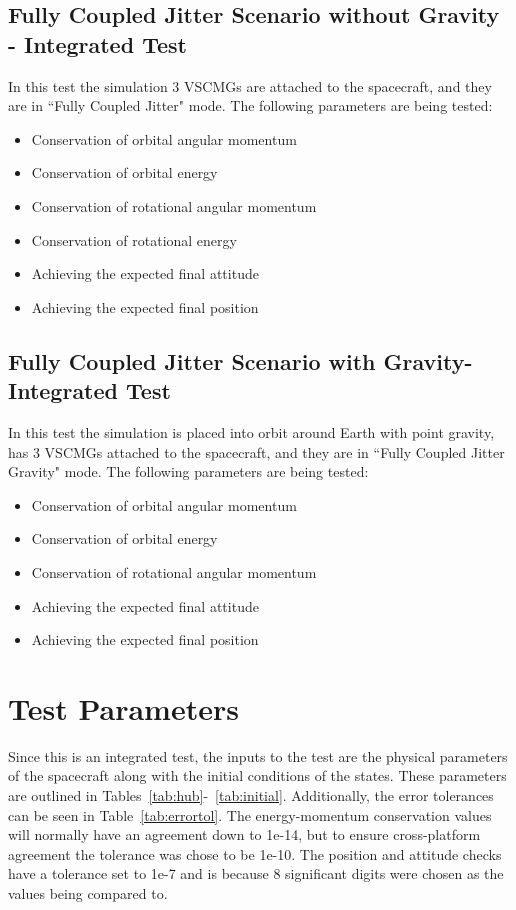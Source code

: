 \subsection{Fully Coupled Jitter Scenario without Gravity - Integrated Test}
In this test the simulation 3 VSCMGs are attached to the spacecraft, and they are in ``Fully Coupled Jitter" mode.  The following parameters are being tested:
\begin{itemize}
\item Conservation of orbital angular momentum
\item Conservation of orbital energy
\item Conservation of rotational angular momentum
\item Conservation of rotational energy
\item Achieving the expected final attitude
\item Achieving the expected final position
\end{itemize}

\subsection{Fully Coupled Jitter Scenario  with Gravity- Integrated Test}
In this test the simulation is placed into orbit around Earth with point gravity, has 3 VSCMGs attached to the spacecraft, and they are in ``Fully Coupled Jitter Gravity" mode. The following parameters are being tested:
\begin{itemize}
\item Conservation of orbital angular momentum
\item Conservation of orbital energy
\item Conservation of rotational angular momentum
\item Achieving the expected final attitude
\item Achieving the expected final position
\end{itemize}

\section{Test Parameters}

Since this is an integrated test, the inputs to the test are the physical parameters of the spacecraft along with the initial conditions of the states. These parameters are outlined in Tables~\ref{tab:hub}-~\ref{tab:initial}. Additionally, the error tolerances can be seen in Table~\ref{tab:errortol}. The energy-momentum conservation values will normally have an agreement down to 1e-14, but to ensure cross-platform agreement the tolerance was chose to be 1e-10. The position and attitude checks have a tolerance set to 1e-7 and is because 8 significant digits were chosen as the values being compared to. 

